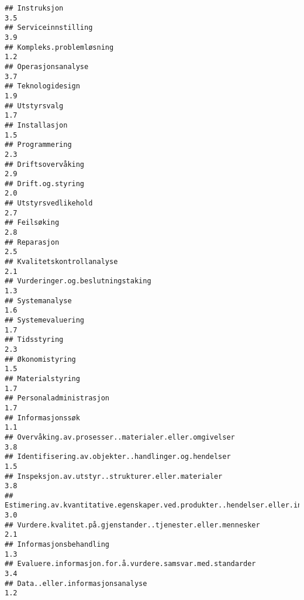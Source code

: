 \documentclass[
]{article}
\begin{document}
\begin{verbatim}
## Instruksjon                                                                      3.5
## Serviceinnstilling                                                               3.9
## Kompleks.problemløsning                                                          1.2
## Operasjonsanalyse                                                                3.7
## Teknologidesign                                                                  1.9
## Utstyrsvalg                                                                      1.7
## Installasjon                                                                     1.5
## Programmering                                                                    2.3
## Driftsovervåking                                                                 2.9
## Drift.og.styring                                                                 2.0
## Utstyrsvedlikehold                                                               2.7
## Feilsøking                                                                       2.8
## Reparasjon                                                                       2.5
## Kvalitetskontrollanalyse                                                         2.1
## Vurderinger.og.beslutningstaking                                                 1.3
## Systemanalyse                                                                    1.6
## Systemevaluering                                                                 1.7
## Tidsstyring                                                                      2.3
## Økonomistyring                                                                   1.5
## Materialstyring                                                                  1.7
## Personaladministrasjon                                                           1.7
## Informasjonssøk                                                                  1.1
## Overvåking.av.prosesser..materialer.eller.omgivelser                             3.8
## Identifisering.av.objekter..handlinger.og.hendelser                              1.5
## Inspeksjon.av.utstyr..strukturer.eller.materialer                                3.8
## Estimering.av.kvantitative.egenskaper.ved.produkter..hendelser.eller.informasjon 3.0
## Vurdere.kvalitet.på.gjenstander..tjenester.eller.mennesker                       2.1
## Informasjonsbehandling                                                           1.3
## Evaluere.informasjon.for.å.vurdere.samsvar.med.standarder                        3.4
## Data..eller.informasjonsanalyse                                                  1.2

\end{verbatim}
\end{document}
